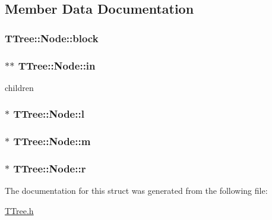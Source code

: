 \subsection{Member Data Documentation}
\hypertarget{structTTree_1_1Node_a100664635a89fa354373102768bd22be}{}
\subsubsection[{block}]{ T\+Tree\+::\+Node\+::block}\label{structTTree_1_1Node_a100664635a89fa354373102768bd22be}
\hypertarget{structTTree_1_1Node_ab126c67191b7e91a1eccc18a3eeadf0b}{}
\subsubsection[{in}]{$\ast$$\ast$ T\+Tree\+::\+Node\+::in}\label{structTTree_1_1Node_ab126c67191b7e91a1eccc18a3eeadf0b}


children 

\hypertarget{structTTree_1_1Node_a78f1bf067928d0e0106e1187364cc69e}{}
\subsubsection[{l}]{$\ast$ T\+Tree\+::\+Node\+::l}\label{structTTree_1_1Node_a78f1bf067928d0e0106e1187364cc69e}
\hypertarget{structTTree_1_1Node_a3f47f1068b4631b1d9eddea0300c6bee}{}
\subsubsection[{m}]{ $\ast$ T\+Tree\+::\+Node\+::m}\label{structTTree_1_1Node_a3f47f1068b4631b1d9eddea0300c6bee}
\hypertarget{structTTree_1_1Node_adb67ed846e6787b3ff26bbcee11ee4b6}{}
\subsubsection[{r}]{ $\ast$ T\+Tree\+::\+Node\+::r}\label{structTTree_1_1Node_adb67ed846e6787b3ff26bbcee11ee4b6}


The documentation for this struct was generated from the following file\+:\begin{DoxyCompactItemize}
\item 
\hyperlink{TTree_8h}{T\+Tree.\+h}\end{DoxyCompactItemize}
